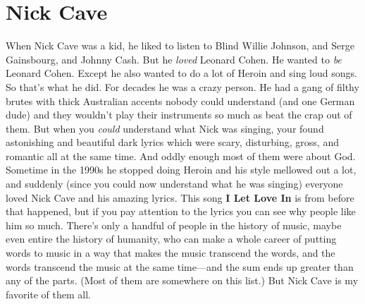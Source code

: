 \documentclass[letterpaper,single]{article}
\begin{document}
\section{Nick Cave}
When Nick Cave was a kid, he liked to listen to Blind Willie Johnson, and Serge Gainsbourg, and Johnny Cash. 
But he \emph{loved} Leonard Cohen. 
He wanted to \emph{be} Leonard Cohen. 
Except he also wanted to do a lot of Heroin and sing loud songs. 
So that's what he did. 
For decades he was a crazy person. 
He had a gang of filthy brutes with thick Australian accents nobody could understand (and one German dude) and they wouldn't play their instruments so much as beat the crap out of them. 
But when you \emph{could} understand what Nick was singing, your found astonishing and beautiful dark lyrics which were scary, disturbing, gross, and romantic all at the same time. 
And oddly enough most of them were about God.
Sometime in the 1990s he stopped doing Heroin and his style mellowed out a lot, and suddenly (since you could now understand what he was singing) everyone loved Nick Cave and his amazing lyrics.
This song \textbf{I Let Love In} is from before that happened, but if you pay attention to the lyrics you can see why people like him so much.
There's only a handful of people in the history of music, maybe even entire the history of humanity, who can make a whole career of putting words to music in a way that makes the music transcend the words, and the words transcend the music at the same time---and the sum ends up greater than any of the parts.
(Most of them are somewhere on this list.)
But Nick Cave is my favorite of them all.
\end{document}
